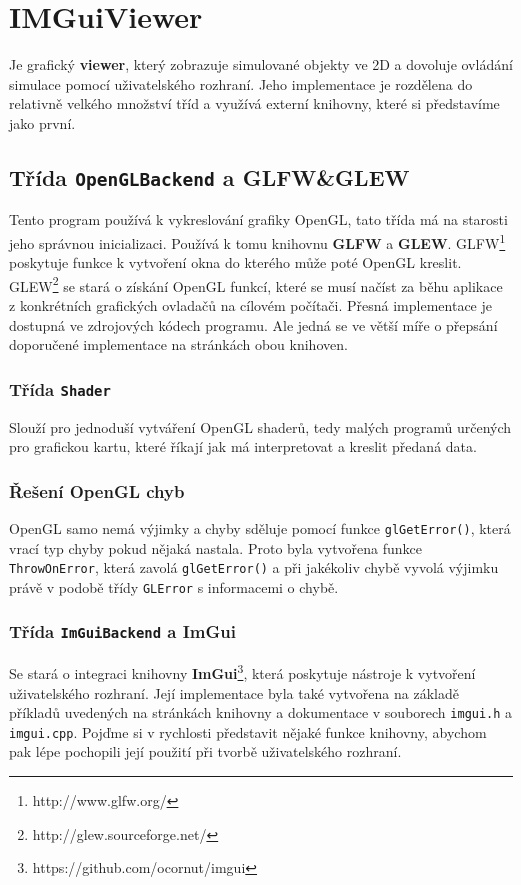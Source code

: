 \chapter{IMGuiViewer}
Je grafický \textbf{viewer}, který zobrazuje simulované objekty ve 2D a dovoluje ovládání simulace pomocí uživatelského rozhraní. Jeho implementace je rozdělena do relativně velkého množství tříd a využívá externí knihovny, které si představíme jako první.

\section{Třída \texttt{OpenGLBackend} a GLFW\&GLEW}
Tento program používá k vykreslování grafiky OpenGL, tato třída má na starosti jeho správnou inicializaci. Používá k tomu knihovnu \textbf{GLFW} a \textbf{GLEW}.
GLFW\footnote{http://www.glfw.org/} poskytuje funkce k vytvoření okna do kterého může poté OpenGL kreslit.
GLEW\footnote{http://glew.sourceforge.net/} se stará o získání OpenGL funkcí, které se musí načíst za běhu aplikace z konkrétních grafických ovladačů na cílovém počítači.
Přesná implementace je dostupná ve zdrojových kódech programu. Ale jedná se ve větší míře o přepsání doporučené implementace na stránkách obou knihoven.

\subsection{Třída \texttt{Shader}}
Slouží pro jednoduší vytváření OpenGL shaderů, tedy malých programů určených pro grafickou kartu, které říkají jak má interpretovat a kreslit předaná data.
\subsection{Řešení OpenGL chyb} 
OpenGL samo nemá výjimky a chyby sděluje pomocí funkce \texttt{glGetError()}, která vrací typ chyby pokud nějaká nastala. Proto byla vytvořena funkce \texttt{ThrowOnError}, která zavolá \texttt{glGetError()} a při jakékoliv chybě vyvolá výjimku právě v podobě třídy \texttt{GLError} s informacemi o chybě.
\subsection{Třída \texttt{ImGuiBackend} a ImGui}
Se stará o integraci knihovny \textbf{ImGui}\footnote{https://github.com/ocornut/imgui}, která poskytuje nástroje k vytvoření uživatelského rozhraní.
Její implementace byla také vytvořena na základě příkladů uvedených na stránkách knihovny a dokumentace v souborech \texttt{imgui.h} a \texttt{imgui.cpp}.
Pojďme si v rychlosti představit nějaké funkce knihovny, abychom pak lépe pochopili její použití při tvorbě uživatelského rozhraní.


